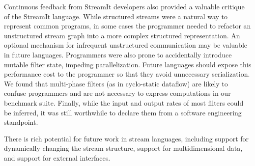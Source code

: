 Continuous feedback from StreamIt developers also provided a valuable
critique of the StreamIt language.  While structured streams were a
natural way to represent common programs, in some cases the programmer
needed to refactor an unstructured stream graph into a more complex
structured representation.  An optional mechanism for infrequent
unstructured communication may be valuable in future languages.
Programmers were also prone to accidentally introduce mutable filter
state, impeding parallelization.  Future languages should expose this
performance cost to the programmer so that they avoid unnecessary
serialization.  We found that multi-phase filters (as in cyclo-static
dataflow) are likely to confuse programmers and are not necessary to
express computations in our benchmark suite.  Finally, while the input
and output rates of most filters could be inferred, it was still
worthwhile to declare them from a software engineering standpoint.

There is rich potential for future work in stream languages, including
support for dynamically changing the stream structure, support for
multidimensional data, and support for external interfaces.

